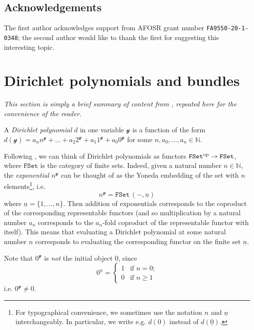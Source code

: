 \documentclass[11pt,fleqn]{article}
\renewcommand{\geq}{\geqslant}
\newcommand{\yon}{\mathcal{y}}
\newcommand{\op}{^\textnormal{op}}
\newcommand{\cat}[1]{\mathtt{#1}}
\newcommand{\FSet}{\cat{FSet}}
\begin{document}
\subsection*{Acknowledgements}

The first author acknowledges support from AFOSR grant number \texttt{FA9550-20-1-0348};
the second author would like to thank the first for suggesting this interesting topic.


\section{Dirichlet polynomials and bundles}
\label{section:dir-and-bun}

\emph{This section is simply a brief summary of content from \cite{SM2020}, repeated here for the convenience of the reader.}

\begin{definition}
  A \emph{Dirichlet polynomial} $d$ in one variable $\yon$ is a function of the form $d(\yon)=a_n n^\yon + \ldots + a_2 2^\yon + a_1 1^\yon + a_0 0^\yon$ for some $n,a_0,\ldots,a_n\in\mathbb{N}$.
\end{definition}

Following \cite{SM2020}, we can think of Dirichlet polynomials as functors $\FSet\op\to\FSet$, where $\FSet$ is the category of finite sets.
Indeed, given a natural number $n\in\mathbb{N}$, the \emph{exponential} $n^\yon$ can be thought of as the Yoneda embedding of the set with $n$ elements\footnote{For typographical convenience, we sometimes use the notation $n$ and $\underline{n}$ interchangeably. In particular, we write e.g. $d(0)$ instead of $d(\underline{0})$.}, i.e.
\[
  n^\yon = \FSet\,(-,\underline{n})
\]
where $\underline{n}=\{1,\ldots,n\}$.
Then addition of exponentials corresponds to the coproduct of the corresponding representable functors (and so multiplication by a natural number $a_n$ corresponds to the $a_n$-fold coproduct of the representable functor with itself).
This means that evaluating a Dirichlet polynomial at some natural number $n$ corresponds to evaluating the corresponding functor on the finite set $\underline{n}$.

Note that $0^\yon$ is \emph{not} the initial object $0$, since
\[
  0^{\underline{n}} =
  \begin{cases}
    1 &\mbox{if $n=0$;}
  \\0 &\mbox{if $n\geq1$}
  \end{cases}
\]
i.e. $0^\yon\neq0$.
\end{document}
